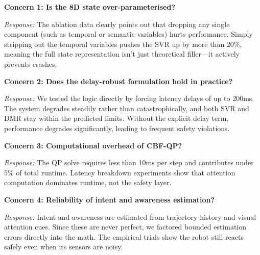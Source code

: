 \documentclass[10pt,twocolumn]{article}
\begin{document}
\textbf{Concern 1: Is the 8D state over-parameterised?}

\emph{Response:}
The ablation data clearly points out that dropping any single component (such as temporal or semantic variables) hurts performance. Simply stripping out the temporal variables pushes the SVR up by more than 20\%, meaning the full state representation isn't just theoretical filler---it actively prevents crashes.

\textbf{Concern 2: Does the delay-robust formulation hold in practice?}

\emph{Response:}
We tested the logic directly by forcing latency delays of up to 200ms. The system degrades steadily rather than catastrophically, and both SVR and DMR stay within the predicted limits. Without the explicit delay term, performance degrades significantly, leading to frequent safety violations.

\textbf{Concern 3: Computational overhead of CBF-QP?}

\emph{Response:}
The QP solve requires less than 10ms per step and contributes under 5\% of total runtime. Latency breakdown experiments show that attention computation dominates runtime, not the safety layer.

\textbf{Concern 4: Reliability of intent and awareness estimation?}

\emph{Response:}
Intent and awareness are estimated from trajectory history and visual attention cues. Since these are never perfect, we factored bounded estimation errors directly into the math. The empirical trials show the robot still reacts safely even when its sensors are noisy.
\end{document}
